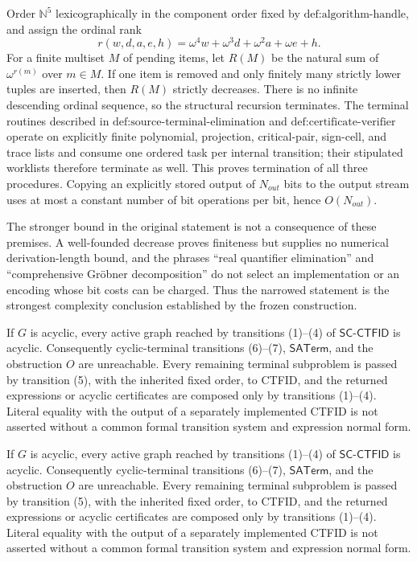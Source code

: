 Order \(\mathbb N^5\) lexicographically in the component order fixed by \(\text{def:algorithm-handle}\), and assign the ordinal rank
\[
 r(w,d,a,e,h)=\omega^4w+\omega^3d+\omega^2a+\omega e+h.
\]
For a finite multiset \(M\) of pending items, let \(R(M)\) be the natural sum of \(\omega^{r(m)}\) over \(m\in M\).  If one item is removed and only finitely many strictly lower tuples are inserted, then \(R(M)\) strictly decreases.  There is no infinite descending ordinal sequence, so the structural recursion terminates.  The terminal routines described in \(\text{def:source-terminal-elimination}\) and \(\text{def:certificate-verifier}\) operate on explicitly finite polynomial, projection, critical-pair, sign-cell, and trace lists and consume one ordered task per internal transition; their stipulated worklists therefore terminate as well.  This proves termination of all three procedures.  Copying an explicitly stored output of \(N_{out}\) bits to the output stream uses at most a constant number of bit operations per bit, hence \(O(N_{out})\).

The stronger bound in the original statement is not a consequence of these premises.  A well-founded decrease proves finiteness but supplies no numerical derivation-length bound, and the phrases ``real quantifier elimination'' and ``comprehensive Gr\"obner decomposition'' do not select an implementation or an encoding whose bit costs can be charged.  Thus the narrowed statement is the strongest complexity conclusion established by the frozen construction.

If \(G\) is acyclic, every active graph reached by transitions (1)--(4) of \(\mathsf{SC\mbox{-}CTFID}\) is acyclic.  Consequently cyclic-terminal transitions (6)--(7), \(\mathsf{SATerm}\), and the obstruction \(O\) are unreachable.  Every remaining terminal subproblem is passed by transition (5), with the inherited fixed order, to CTFID, and the returned expressions or acyclic certificates are composed only by transitions (1)--(4).  Literal equality with the output of a separately implemented CTFID is not asserted without a common formal transition system and expression normal form.

If \(G\) is acyclic, every active graph reached by transitions (1)--(4) of \(\mathsf{SC\mbox{-}CTFID}\) is acyclic.  Consequently cyclic-terminal transitions (6)--(7), \(\mathsf{SATerm}\), and the obstruction \(O\) are unreachable.  Every remaining terminal subproblem is passed by transition (5), with the inherited fixed order, to CTFID, and the returned expressions or acyclic certificates are composed only by transitions (1)--(4).  Literal equality with the output of a separately implemented CTFID is not asserted without a common formal transition system and expression normal form.

